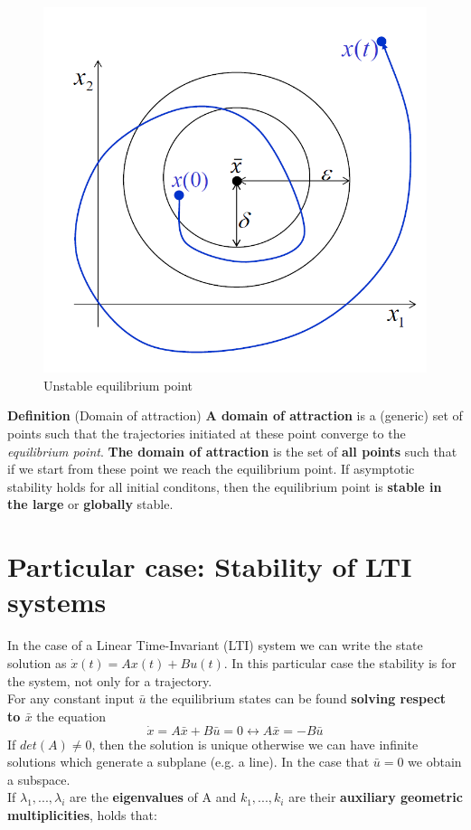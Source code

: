\begin{figure}[h]
    \centering
    \includegraphics[scale=0.5]{NonLinearControl/images/EqUnstable.png}
    \caption{Unstable equilibrium point}
    \label{fig:enter-label}
\end{figure}

\vspace{1cm}
\noindent
\textbf{Definition} (Domain of attraction) \textbf{A domain of attraction} is a (generic) set of points such that the trajectories initiated at these point converge to the \textit{equilibrium point}. \textbf{The domain of attraction} is the set of \textbf{all points} such that if we start from these point we reach the equilibrium point. If asymptotic stability holds for all initial conditons, then the equilibrium point is \textbf{stable in the large} or \textbf{globally} stable.

\section{Particular case: Stability of LTI systems}
In the case of a Linear Time-Invariant (LTI) system we can write the state solution as $\dot{x}(t)=Ax(t)+Bu(t)$. In this particular case the stability is for the system, not only for a trajectory.\\
For any constant input $\bar{u}$ the equilibrium states can be found \textbf{solving respect to $\bar{x}$} the equation
\begin{equation*}
    \dot{x}=A\bar{x}+B\bar{u}=0 \longleftrightarrow 
    A\bar{x}=-B\bar{u}
\end{equation*}
If $det(A)\ne 0$, then the solution is unique otherwise we can have infinite solutions which generate a subplane (e.g. a line). In the case that $\bar{u}=0$ we obtain a subspace.\\
If $\lambda_1,..., \lambda_i$ are the  \textbf{eigenvalues} of A and $k_1,..., k_i$ are their \textbf{auxiliary geometric multiplicities}, holds that: \\

